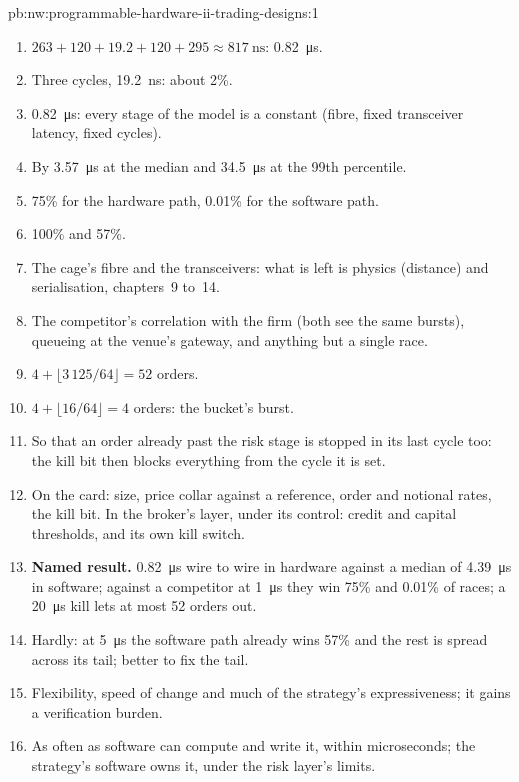\begin{solution}{pb:nw:programmable-hardware-ii-trading-designs:1}
\begin{enumerate}
\item $263 + 120 + 19.2 + 120 + 295 \approx \qty{817}{\nano\second}$: \qty{0.82}{\micro\second}.
\item Three cycles, \qty{19.2}{\nano\second}: about 2\%.
\item \qty{0.82}{\micro\second}: every stage of the model is a constant (fibre, fixed transceiver latency, fixed cycles).
\item By \qty{3.57}{\micro\second} at the median and \qty{34.5}{\micro\second} at the 99th percentile.
\item 75\% for the hardware path, 0.01\% for the software path.
\item 100\% and 57\%.
\item The cage's fibre and the transceivers: what is left is physics (distance) and serialisation, chapters~9 to~14.
\item The competitor's correlation with the firm (both see the same bursts), queueing at the venue's gateway, and anything but a single race.
\item $4 + \lfloor 3\,125/64\rfloor = 52$ orders.
\item $4 + \lfloor 16/64\rfloor = 4$ orders: the bucket's burst.
\item So that an order already past the risk stage is stopped in its last cycle too: the kill bit then blocks everything from the cycle it
  is set.
\item On the card: size, price collar against a reference, order and notional rates, the kill bit. In the broker's layer, under its control:
  credit and capital thresholds, and its own kill switch.
\item \textbf{Named result.} \qty{0.82}{\micro\second} wire to wire in hardware against a median of \qty{4.39}{\micro\second} in software; against a
  competitor at \qty{1}{\micro\second} they win 75\% and 0.01\% of races; a \qty{20}{\micro\second} kill lets at most 52 orders out.
\item Hardly: at \qty{5}{\micro\second} the software path already wins 57\% and the rest is spread across its tail; better to fix the tail.
\item Flexibility, speed of change and much of the strategy's expressiveness; it gains a verification burden.
\item As often as software can compute and write it, within microseconds; the strategy's software owns it, under the risk layer's limits.

\end{enumerate}
\end{solution}
